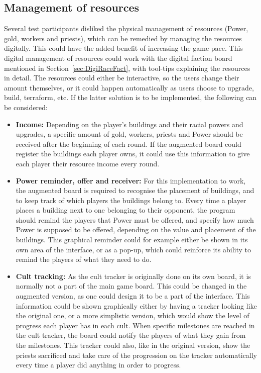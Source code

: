 \subsection{Management of resources}
Several test participants disliked the physical management of resources (Power, gold, workers and priests), which can be remedied by managing the resources digitally. This could have the added benefit of increasing the game pace. This digital management of resources could work with the digital faction board mentioned in Section~\ref{sec:DigiRaceFact}, with tool-tips explaining the resources in detail. The resources could either be interactive, so the users change their amount themselves, or it could happen automatically as users choose to upgrade, build, terraform, etc. If the latter solution is to be implemented, the following can be considered:
\begin{itemize}
\item \textbf{Income:} Depending on the player's buildings and their racial powers and upgrades, a specific amount of gold, workers, priests and Power should be received after the beginning of each round. If the augmented board could register the buildings each player owns, it could use this information to give each player their resource income every round. 
\item \textbf{Power reminder, offer and receiver:} For this implementation to work, the augmented board is required to recognise the placement of buildings, and to keep track of which players the buildings belong to. Every time a player places a building next to one belonging to their opponent, the program should remind the players that Power must be offered, and specify how much Power is supposed to be offered, depending on the value and placement of the buildings. This graphical reminder could for example either be shown in its own area of the interface, or as a pop-up, which could reinforce its ability to remind the players of what they need to do.
\item \textbf{Cult tracking:} As the cult tracker is originally done on its own board, it is normally not a part of the main game board. This could be changed in the augmented version, as one could design it to be a part of the interface. This information could be shown graphically either by having a tracker looking like the original one, or a more simplistic version, which would show the level of progress each player has in each cult. When specific milestones are reached in the cult tracker, the board could notify the players of what they gain from the milestones. This tracker could also, like in the original version, show the priests sacrificed and take care of the progression on the tracker automatically every time a player did anything in order to progress.
\end{itemize}